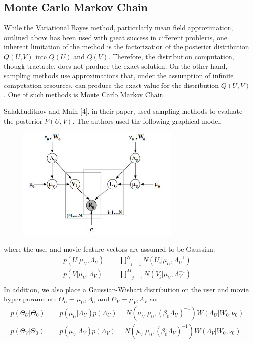 \documentclass[journal,onecolumn]{IEEEtran}
\begin{document}
\subsection{Monte Carlo Markov Chain}
While the Variational Bayes method, particularly mean field approximation, outlined above has been used with great success in different problems, one inherent limitation of the method is the factorization of the posterior distribution $ Q(U,V) $ into $ Q(U) $ and $ Q(V) $. Therefore, the distribution computation, though tractable, does not produce the exact solution. On the other hand, sampling methods use approximations that, under the assumption of infinite computation resources, can produce the exact value for the distribution $ Q(U,V) $. One of such methods is Monte Carlo Markov Chain. 

Salakhuditnov and Mnih [4], in their paper, used sampling methods to evaluate the posterior $ P(U,V) $. The authors used the following graphical model.
\begin{figure}[H]
	\centering
	\includegraphics[width=80mm]{mcmc-model}
\end{figure}
where the user and movie feature vectors are assumed to be Gaussian:
\begin{equation*}
\begin{split}
	p(U | \mu_U, \Lambda_U) &= \underset{i=1}{\overset{N}{\prod}} N(U_i | \mu_U, \Lambda_U^{-1})\\
	p(V | \mu_V, \Lambda_V) &= \underset{j=1}{\overset{M}{\prod}} N(V_j | \mu_V, \Lambda_V^{-1})\\
\end{split}
\end{equation*}
In addition, we also place a Gaussian-Wishart distribution on the user and movie hyper-parameters $ \Theta_U ={\mu_U, \Lambda_U} $ and $ \Theta_V ={\mu_V, \Lambda_V} $ as:
\begin{equation*}
\begin{split}
	p(\Theta_U|\Theta_0) &= p(\mu_U|\Lambda_U)p(\Lambda_U) = N(\mu_U|\mu_0, (\beta_0\Lambda_U)^{-1})W(\Lambda_U|W_0,\nu_0)\\
	p(\Theta_V|\Theta_0) &= p(\mu_V|\Lambda_V)p(\Lambda_V) = N(\mu_V|\mu_0, (\beta_0\Lambda_V)^{-1})W(\Lambda_V|W_0,\nu_0)\\
\end{split}
\end{equation*}
\end{document}
